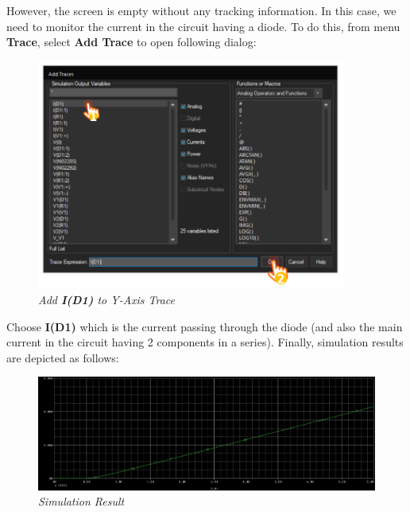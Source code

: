 However, the screen is empty without any tracking information. In this case, we need to monitor the current in the circuit having a diode. To do this, from menu \textbf{Trace}, select \textbf{Add Trace} to open following dialog:

\begin{figure}[!htp]
    \centering
    \includegraphics[width=4in]{source/picture/bai_2/14_ChooseID1ToYAxis.png}
    \caption{\textit{Add \textbf{I(D1)} to Y-Axis Trace}}
    \label{bai2_pic14}
\end{figure}

Choose \textbf{I(D1)} which is the current passing through the diode (and also the main current in the circuit having 2 components in a series). Finally, simulation results are depicted as follows:
\newpage
\begin{figure}[!htp]
    \centering
    \includegraphics[width=5.5in]{source/picture/bai_2/15_ResultAfterAddYAxis.png}
    \caption{\textit{Simulation Result}}
    \label{bai2_pic15}
\end{figure}

